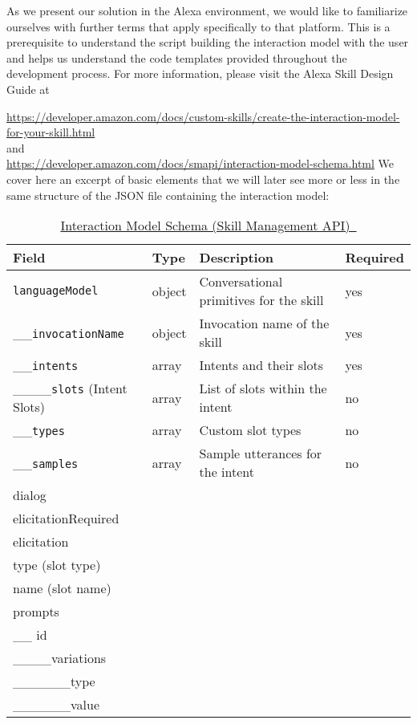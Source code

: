 As we present our solution in the Alexa environment, we would like to familiarize ourselves with further terms that apply specifically to that platform. This is a prerequisite to understand the script building the interaction model with the user and helps us understand the code templates provided throughout the development process. %
For more information, please visit the Alexa Skill Design Guide at

\noindent \url{https://developer.amazon.com/docs/custom-skills/create-the-interaction-model-for-your-skill.html}\\
and\\
\noindent
\url{https://developer.amazon.com/docs/smapi/interaction-model-schema.html}
We cover here an excerpt of basic elements that we will later see more or less in the same structure of the JSON file containing the interaction model:




\begin{table}[h]
\caption{\href{https://developer.amazon.com/docs/smapi/interaction-model-schema.html}{Interaction Model Schema (Skill Management API)~\cite{alexaDesignGuide} }}\label{interactionModel}
	\begin{tabularx}{\textwidth}{|l | l l l }
	Field	&	Type	&	Description		&	Required \\ \hline
\lstinline|languageModel| &	object	& Conversational primitives for the skill	& yes\\
\_\_\lstinline|invocationName| &	object	& Invocation name of the skill	& yes\\
\_\_\lstinline|intents| &	array	& Intents and their slots	& yes\\
\_\_\_\_\lstinline|slots| (Intent Slots) & array & List of slots within the intent	& no\\
\_\_\lstinline|types| &	array	& Custom slot types		& no\\
\_\_\lstinline|samples|	& array	 & Sample utterances for the intent	& no\\

dialog & & & \\
elicitationRequired & & & \\
elicitation & & & \\
type (slot type) & & & \\
name (slot name) & & & \\

prompts & & & \\
\_\_ id  & & & \\
\_\_\_\_variations  & & & \\
\_\_\_\_\_\_type  & & & \\
\_\_\_\_\_\_value  & & & \\
			
	\end{tabularx}			
\end{table}






